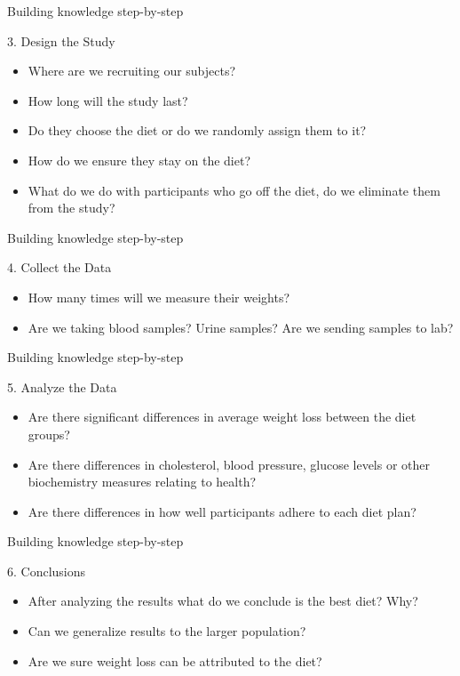 \documentclass[14pt]{beamer}\usepackage[]{graphicx}\usepackage[]{color}
\begin{document}
\begin{frame}[fragile]{Building knowledge step-by-step}

3. Design the Study

\begin{itemize}
\item Where are we recruiting our subjects?
\item How long will the study last?
\item Do they choose the diet or do we randomly assign them to it?
\item How do we ensure they stay on the diet?
\item What do we do with participants who go off the diet, do we eliminate them from the study?
\end{itemize}
\end{frame}

\begin{frame}[fragile]{Building knowledge step-by-step}

4. Collect the Data

\begin{itemize}
\item How many times will we measure their weights?
\item Are we taking blood samples? Urine samples? Are we sending samples to lab?
\end{itemize}
\end{frame}

\begin{frame}[fragile]{Building knowledge step-by-step}

5. Analyze the Data

\begin{itemize}
\item Are there significant differences in average weight loss between the diet groups?
\item Are there differences in cholesterol, blood pressure, glucose levels or other biochemistry measures relating to health?
\item Are there differences in how well participants adhere to each diet plan?
\end{itemize}
\end{frame}

\begin{frame}[fragile]{Building knowledge step-by-step}

6. Conclusions

\begin{itemize}
\item After analyzing the results what do we conclude is the best diet? Why?
\item Can we generalize results to the larger population?
\item Are we sure weight loss can be attributed to the diet?
\end{itemize}
\end{frame}
\end{document}
